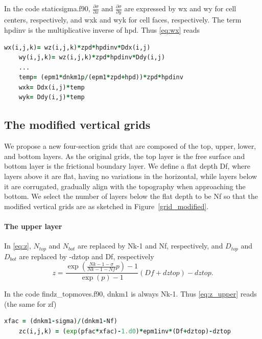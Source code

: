 \documentclass[12pt,letterpaper,titlepage]{article}
\newcommand{\Blue}[1]{{\color{blue}#1}}
\begin{document}
In the code staticsigma.f90, $\frac{\partial \sigma}{\partial x}$ and $\frac{\partial \sigma}{\partial y}$ are expressed by \Blue{wx} and \Blue{wy} for cell centers, respectively, and \Blue{wxk} and \Blue{wyk} for cell faces, respectively. The term \Blue{hpdinv} is the multiplicative inverse of hpd. Thus \eqref{eq:wx} reads
\begin{lstlisting}[language=Fortran, caption=staticsigma.f90]
    wx(i,j,k)= wz(i,j,k)*zpd*hpdinv*Ddx(i,j) 
    wy(i,j,k)= wz(i,j,k)*zpd*hpdinv*Ddy(i,j) 
    ...
    temp= (epm1*dnkm1p/(epm1*zpd+hpd))*zpd*hpdinv 
    wxk= Ddx(i,j)*temp 
    wyk= Ddy(i,j)*temp 
\end{lstlisting}

\subsection{The modified vertical grids}

We propose a new four-section grids that are composed of the top, upper, lower, and bottom layers. As the original grids, the top layer is the free surface and bottom layer is the frictional boundary layer. We define a flat depth \Blue{Df}, where layers above it are flat, having no variations in the horizontal, while layers below it are corrugated, gradually align with the topography when approaching the bottom. We select the number of layers below the flat depth to be \Blue{Nf} so that the modified vertical grids are as sketched in Figure~\ref{grid_modified}.\par

\paragraph{The upper layer}
In \eqref{eq:z}, $N_{top}$ and $N_{bot}$ are replaced by Nk-1 and Nf, respectively, and $D_{top}$ and $D_{bot}$ are replaced by -dztop and Df, respectively
\begin{equation}
  z = \frac{\exp\left(\frac{Nk-1-\sigma}{Nk-1-Nf}p\right)-1}{\exp(p)-1}(Df+dztop)-dztop. \label{eq:z_upper}
\end{equation}

In the code findz\_topmoves.f90, dnkm1 is always Nk-1. Thus \eqref{eq:z_upper} reads (the same for zf)
\begin{lstlisting}[language=Fortran, caption=findz\_topmoves.f90 (for the upper layer)]
    xfac = (dnkm1-sigma)/(dnkm1-Nf)
    zc(i,j,k) = (exp(pfac*xfac)-1.d0)*epm1inv*(Df+dztop)-dztop
\end{lstlisting}
\end{document}
